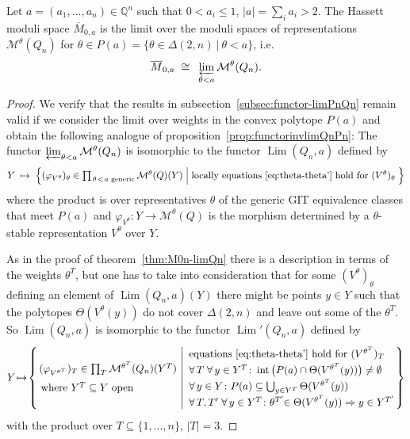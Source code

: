 \documentclass[ALCO,ThmDefs,Unicode,epreuves]{cedram}
\def\Q{\mathds Q}
\def\phi{\varphi}
\DeclareMathOperator{\interior}{int}
\DeclareMathOperator{\Lim}{Lim}
\begin{document}
\begin{theo}\label{thm:M0a-limQna}
Let $a=(a_1,\ldots,a_n)\in\Q^n$ such that $0<a_i\leq1$, $|a|=\sum_ia_i>2$.
The Hassett moduli space $\overline{M}_{0,a}$ is the limit over
the moduli spaces of representations $\mathcal M^\theta(Q_n)$ for
$\theta\in P(a)=\{\theta\in\Delta(2,n)\:|\:\theta<a\}$, i.e.\
\[\overline{M}_{0,a}\;\cong\;\:\varprojlim_{\theta<a}\mathcal M^\theta(Q_n).\]
\end{theo}
\begin{proof}
We verify that the results in subsection~\ref{subsec:functor-limPnQn} remain valid
if we consider the limit over weights in the convex polytope $P(a)$ and obtain the 
following analogue of proposition~\ref{prop:functorinvlimQnPn}:
The functor $\varprojlim_{\theta<a}\mathcal M^\theta(Q_n)$ is isomorphic to the 
functor $\Lim(Q_n,a)$ defined by
\[\textstyle
Y\;\mapsto\;
\Big\{
(\phi_{V^\theta})_\theta\in\prod_{\,\text{$\theta\!<\!a$ generic}}
\mathcal M^\theta(Q)(Y)
\;\Big|\;
\text{locally equations~\eqref{eq:theta-theta'} hold for $(V^\theta)_\theta$}\;
\Big\}
\]
where the product is over representatives $\theta$ of the generic GIT equivalence classes
that meet $P(a)$ and $\phi_{V^\theta}\colon Y\to\mathcal M^\theta(Q)$ is the morphism 
determined by a $\theta$-stable representation $V^\theta$ over $Y$.

As in the proof of theorem~\ref{thm:M0n-limQn} there is a description in terms of 
the weights $\theta^T$, but one has to take into consideration that for some
$(V^\theta)_\theta$ defining an element of $\Lim(Q_n,a)(Y)$ there might 
be points $y\in Y$ such that the polytopes $\Theta(V^\theta(y))$ do not cover 
$\Delta(2,n)$ and leave out some of the $\theta^T$. So $\Lim(Q_n,a)$ 
is isomorphic to the functor $\Lim'(Q_n,a)$ defined by
\[\textstyle
Y\!\mapsto\!
\left\{\!
\begin{array}{l}\!
(\phi_{V^{\theta^T}})_T\in\prod_T\mathcal M^{\theta^T}(Q_n)(Y^T)\\[1mm]
\text{where $Y^T\subseteq Y$ open}
\end{array}
\!\!\left|
{\renewcommand{\arraystretch}{1.3}
\begin{array}{l}
\text{equations~\eqref{eq:theta-theta'} hold for $(V^{\theta^T})_T$}\\
\forall\,T\;\forall\,y\in Y^T\colon\interior\big(P(a)\cap \Theta(V^{\theta^T}(y))\big)
\neq\emptyset\\
\forall\,y\in Y\colon P(a)\subseteq\bigcup_{y\in Y^T}\Theta(V^{\theta^T}(y))\\
\forall\,T,T'\;\forall\,y\in Y^T\colon \theta^{T'}\!\!\in\Theta(V^{\theta^T}(y))
\Rightarrow y\in Y^{T'}
\end{array}}\!\!\!
\right.\right\}
\]
with the product over $T\subseteq\{1,\ldots,n\}$, $|T|=3$.


\end{proof}
\end{document}
